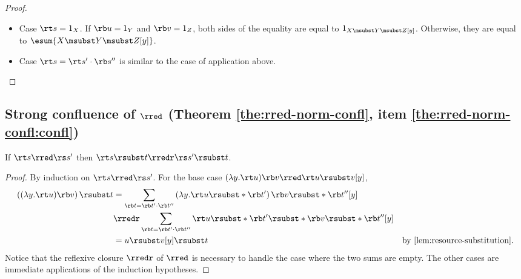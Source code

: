 \begin{proof}
\begin{itemize}
\begin{itemize}
\begin{align*}
				\rt s' \rsubst* {\rb v'_l} [y]
				\rsubst*{ \rb u \rsubst* {\rb v''_l}[y] }
				\rb s'' \rsubst* {\rb v_r} [y] \\
			\shortintertext{by the induction hypothesis on $\rt s'$,}
			& = \sum_{\rb v = (\rb v'_l \cdot \rb v_r) \cdot \rb v''_l}
				\rt s \rsubst* {\rb v'_l \cdot \rb v_r} [y]
				\rsubst* { \rb u \rsubst* {\rb v''_l}[y] }
			\end{align*}
			by re-arranging the indices,
			and using again \cref{lem:rsubst-x-notin-fv}
			together with the hypotheses
			$x \notin Z$ and $x \notin \fv(\rb s'')$.
			This is exactly the desired result.
		\item The case $x \notin \fv(\rt s)$ and $x \in \fv(\rb s'')$
			is symmetric.
		\end{itemize}
	\item Case $\rt s = 1_X$.
		If $\rb u = 1_Y$ and $\rb v = 1_Z$,
		both sides of the equality are equal to
		$1_{X \msubst Y \msubst Z [y]}$.
		Otherwise, they are equal to
		$\esum{X \msubst Y \msubst Z [y]}$.
	\item Case $\rt s = \rt s' \cdot \rb s''$
		is similar to the case of application above.
	\qedhere
	\end{itemize}
	\end{proof}


\subsection{Strong confluence of \texorpdfstring{$\rred$}{→r}
(Theorem \ref{the:rred-norm-confl}, item \ref{the:rred-norm-confl:confl})}

\begin{lemma} \label{lem:rred-and-subst-1}
	If $\rt s \rred \rs s'$ then 
	$\rt s \rsubst t \rredr \rs s' \rsubst t$.
\end{lemma}
	
	\begin{proof}
	By induction on $\rt s \rred \rs s'$.
	For the base case $(\ensuremath{\lambda}y.\rt u)\rb v \rred \rt u \rsubst v [y]$,
	\begin{align*}
		\left( (\ensuremath{\lambda}y.\rt u)\rb v \right) \rsubst t
		& = \sum_{\rb t = \rb t' \cdot \rb t''}
			\left( \ensuremath{\lambda}y.\rt u \rsubst* {\rb t'} \right)
			\rb v \rsubst* {\rb t''} [y] \\
		& \rredr \sum_{\rb t = \rb t' \cdot \rb t''}
			\rt u \rsubst* {\rb t'}
			\rsubst*{ \rb v \rsubst* {\rb t''} } [y] \\
		& = u \rsubst v [y] \rsubst t
			& \text{by \cref{lem:resource-substitution}.}
	\end{align*}
	Notice that the reflexive closure $\rredr$ of $\rred$
	is necessary to handle the case where the two sums
	are empty.
	The other cases are immediate applications 
	of the induction hypotheses.
	\end{proof}

